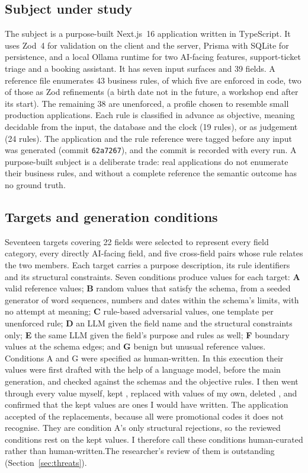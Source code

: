 \documentclass[conference]{IEEEtran}
\begin{document}
\subsection{Subject under study}
The subject is a purpose-built Next.js~16 application written in TypeScript. It uses Zod~4 for
validation on the client and the server, Prisma with SQLite for persistence, and a local Ollama runtime
for two AI-facing features, support-ticket triage and a booking assistant. It has seven input surfaces
and 39 fields. A reference file enumerates 43 business rules, of which five are enforced in code, two of
those as Zod refinements (a birth date not in the future, a workshop end after its start). The remaining
38 are unenforced, a profile chosen to resemble small production applications. Each rule is classified in
advance as objective, meaning decidable from the input, the database and the clock (19 rules), or as
judgement (24 rules). The application and the rule reference were tagged before any input was generated
(commit \texttt{62a7267}), and the commit is recorded with every run. A purpose-built subject is a
deliberate trade: real applications do not enumerate their business rules, and without a complete
reference the semantic outcome has no ground truth.

\subsection{Targets and generation conditions}
Seventeen targets covering 22 fields were selected to represent every field category, every directly
AI-facing field, and five cross-field pairs whose rule relates the two members. Each target carries a
purpose description, its rule identifiers and its structural constraints. Seven conditions produce
values for each target: \textbf{A} valid reference values; \textbf{B} random values that satisfy the
schema, from a seeded generator of word sequences, numbers and dates within the schema's limits, with no
attempt at meaning; \textbf{C} rule-based adversarial values, one template per unenforced rule;
\textbf{D} an LLM given the field name and the structural constraints only; \textbf{E} the same LLM
given the field's purpose and rules as well; \textbf{F} boundary values at the schema edges; and
\textbf{G} benign but unusual reference values. Conditions A and G were
specified as human-written. In this execution their  values were first drafted with the
help of a language model, before the main generation, and checked against the schemas and the
objective rules. \ifreviewed I then went through every value myself, kept , replaced
 with values of my own, deleted , and confirmed that the kept values
are ones I would have written. The application accepted  of the
replacements, because all  were promotional codes it does not recognise. They are
condition A's only structural rejections, so the reviewed conditions rest on the kept values. I therefore call these
conditions human-curated rather than human-written.\else The researcher's review of them is outstanding
(Section~\ref{sec:threats}).\fi
\end{document}
